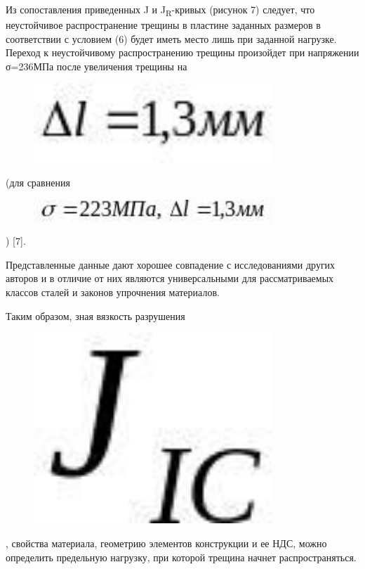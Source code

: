 Из сопоставления приведенных J и J\textsubscript{R}-кривых (рисунок 7)
следует, что неустойчивое распространение трещины в пластине заданных
размеров в соответствии с условием (6) будет иметь место лишь при
заданной нагрузке. Переход к неустойчивому распространению трещины
произойдет при напряжении σ=236МПа после увеличения трещины на
\begin{figure}[H]
	\centering
	\includegraphics[width=0.8\textwidth]{assets/1209}
	\caption*{}
\end{figure} (для сравнения
\begin{figure}[H]
	\centering
	\includegraphics[width=0.8\textwidth]{assets/1210}
	\caption*{}
\end{figure}) {[}7{]}.

Представленные данные дают хорошее совпадение с исследованиями других
авторов и в отличие от них являются универсальными для рассматриваемых
классов сталей и законов упрочнения материалов.

Таким образом, зная вязкость разрушения
\begin{figure}[H]
	\centering
	\includegraphics[width=0.8\textwidth]{assets/1211}
	\caption*{}
\end{figure}, свойства материала, геометрию
элементов конструкции и ее НДС, можно определить предельную нагрузку,
при которой трещина начнет распространяться.

